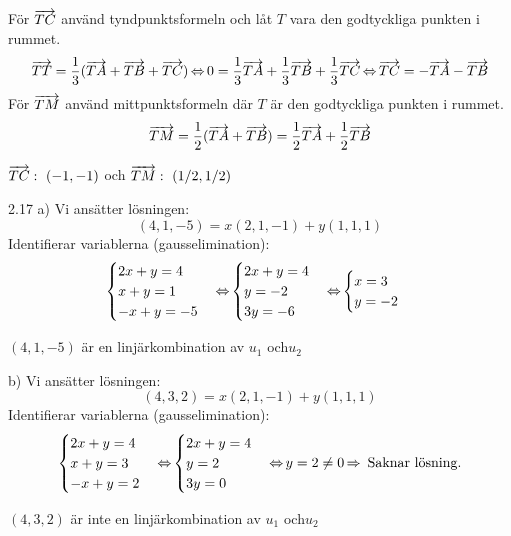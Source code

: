 \begin{task}{2.16}
	För $\overrightarrow{TC}$ använd tyndpunktsformeln och låt $T$ vara den godtyckliga punkten i rummet.
	\[\overrightarrow{TT}=\frac{1}{3}(\overrightarrow{TA}+\overrightarrow{TB}+\overrightarrow{TC}) \operatorname{\Leftrightarrow}
	0=\frac{1}{3}\overrightarrow{TA}+\frac{1}{3}\overrightarrow{TB}+\frac{1}{3}\overrightarrow{TC} \operatorname{\Leftrightarrow}
	\overrightarrow{TC}=-\overrightarrow{TA}-\overrightarrow{TB}\]
	För $\overrightarrow{TM}$ använd mittpunktsformeln där $T$ är den godtyckliga punkten i rummet.
	\[\overrightarrow{TM}=\frac{1}{2}(\overrightarrow{TA}+\overrightarrow{TB})=\frac{1}{2}\overrightarrow{TA}+\frac{1}{2}\overrightarrow{TB}\]
	
	\ans $\overrightarrow{TC}:~(-1,-1)$ och $\overrightarrow{TM}:~(1/2,1/2)$
\end{task}

\begin{task}{2.17 a)}
	Vi ansätter lösningen:
	\[(4,1,-5)=x(2,1,-1)+y(1,1,1)\]
	Identifierar variablerna (gausselimination):
	\[\begin{cases}
		2x+y=4 \\
		x+y=1 \\
		-x+y=-5
	\end{cases} \operatorname{\Leftrightarrow}
	\begin{cases}
		2x+y=4 \\
		y=-2 \\
		3y=-6
	\end{cases} \operatorname{\Leftrightarrow}
	\begin{cases}
		x=3 \\
		y=-2
	\end{cases}\]
	
	\ans $(4,1,-5)$ är en linjärkombination av $u_1$ och$u_2$
\end{task}

\begin{task}{b)}
	Vi ansätter lösningen:
	\[(4,3,2)=x(2,1,-1)+y(1,1,1)\]
	Identifierar variablerna (gausselimination):
	\[\begin{cases}
		2x+y=4 \\
		x+y=3 \\
		-x+y=2
	\end{cases} \operatorname{\Leftrightarrow}
	\begin{cases}
		2x+y=4 \\
		y=2 \\
		3y=0
	\end{cases} \operatorname{\Leftrightarrow}
	y=2\neq0 \operatorname{\Rightarrow} \text{ Saknar lösning.}\]
	
	\ans $(4,3,2)$ är inte en linjärkombination av $u_1$ och$u_2$
\end{task}

